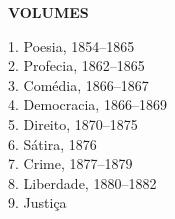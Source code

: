 \begingroup\footnotesize\parindent0pt\vspace*{3em}

\thispagestyle{empty}
{\formular\bfseries VOLUMES}\smallskip

1. Poesia, 1854–1865\\
2. Profecia, 1862–1865\\
3. Comédia, 1866–1867\\
4. Democracia, 1866–1869\\
5. Direito, 1870–1875\\
6. Sátira, 1876\\
7. Crime, 1877–1879\\
8. Liberdade, 1880–1882\\
9. Justiça	

\endgroup
\pagebreak
